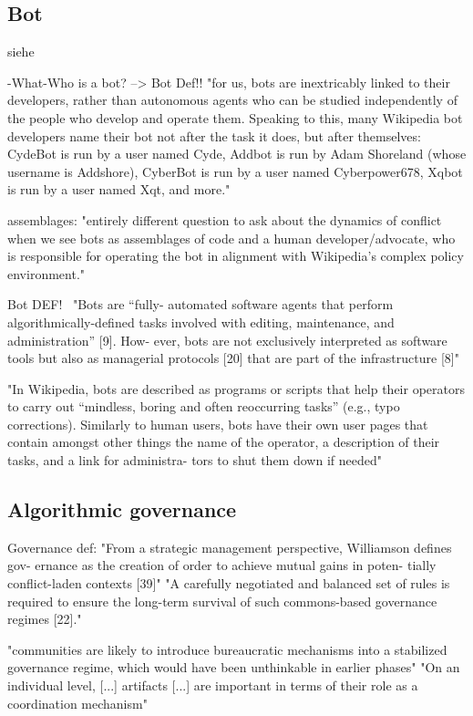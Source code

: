 \documentclass[pdftex,a4paper,11pt]{scrartcl}
\begin{document}
\subsection{Bot}
siehe ~\cite{GeiHal2017}

-What-Who is a bot? --> Bot Def!!
"for us, bots are inextricably linked to their developers, rather than autonomous agents who can
be studied independently of the people who develop and operate them. Speaking to this, many
Wikipedia bot developers name their bot not after the task it does, but after themselves: CydeBot
is run by a user named Cyde, Addbot is run by Adam Shoreland (whose username is Addshore),
CyberBot is run by a user named Cyberpower678, Xqbot is run by a user named Xqt, and more."

assemblages:
"entirely different question to ask about the dynamics of conflict
when we see bots as assemblages of code and a human developer/advocate, who is responsible for
operating the bot in alignment with Wikipedia’s complex policy environment."

Bot DEF!~\cite{MueDoHer2013}
"Bots are “fully-
automated software agents that perform algorithmically-defined tasks
involved with editing, maintenance, and administration” [9]. How-
ever, bots are not exclusively interpreted as software tools but also
as managerial protocols [20] that are part of the infrastructure [8]"

"In Wikipedia, bots are described as programs or scripts that help
their operators to carry out “mindless, boring and often reoccurring
tasks” (e.g., typo corrections). Similarly to human users, bots have
their own user pages that contain amongst other things the name of
the operator, a description of their tasks, and a link for administra-
tors to shut them down if needed"~\cite{MueDoHer2013}

\subsection{Algorithmic governance}
Governance def: "From a strategic management perspective, Williamson defines
gov-
ernance as the creation of order to achieve mutual gains in poten-
tially conflict-laden contexts [39]"
"A carefully negotiated and balanced set of rules
is required to ensure the long-term survival of such commons-based
governance regimes [22]."~\cite{MueDoHer2013}

"communities are likely
to introduce bureaucratic mechanisms into a stabilized governance
regime, which would have been unthinkable in earlier phases"
"On an individual level, [...] artifacts [...] are important in terms of their role as
a coordination mechanism"~\cite{MueDoHer2013}
\end{document}
